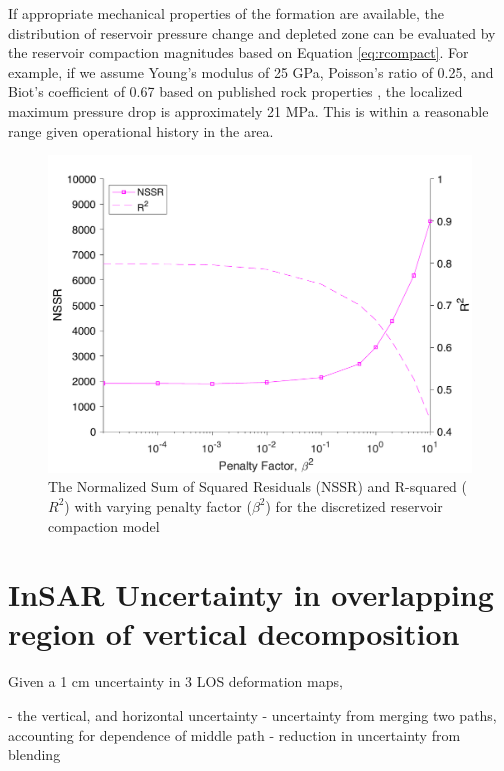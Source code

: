 \documentclass{utexasthesis}
\begin{document}
If appropriate mechanical properties of the formation are available, the distribution of reservoir pressure change and depleted zone can be evaluated by the reservoir compaction magnitudes based on Equation \eqref{eq:rcompact}. For example, if we assume Young’s modulus of 25 GPa, Poisson’s ratio of 0.25, and Biot’s coefficient of 0.67 based on published rock properties \cite{Shukla2013NanoindentationStudiesShales, Xu2015AnalysisStressVariations}, the localized maximum pressure drop is approximately 21 MPa. This is within a reasonable range given operational history in the area.



\begin{figure}
	\centering
	\includegraphics[width=\textwidth]{paper1-permian/figures/supplement/figureS12-reservoir-nssr.pdf}
	\caption[ Normalized Sum of Squared Residuals (NSSR) and R-squared for reservoir compaction model]{The Normalized Sum of Squared Residuals (NSSR) and R-squared ($ R^2 $) with varying penalty factor ($ \beta^2 $) for the discretized reservoir compaction model
	}
	\label{fig:model-reservoir-nssr}
\end{figure}



\chapter{InSAR Uncertainty in overlapping region of vertical decomposition}

Given a 1 cm uncertainty in 3 LOS deformation maps,

- the vertical, and horizontal uncertainty
- uncertainty from merging two paths, accounting for dependence of middle path
- reduction in uncertainty from blending
\end{document}
